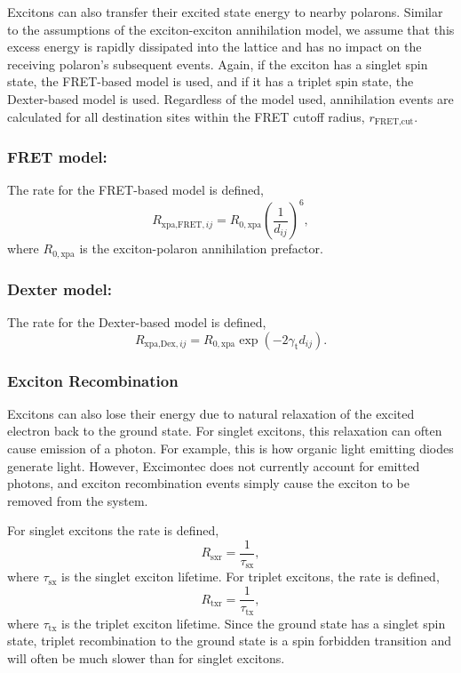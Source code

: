\documentclass[%
 reprint,onecolumn,notitlepage,
superscriptaddress,longbibliography,
 amsmath,amssymb,
 aps,rmp,floatfix,
]{revtex4-1}
\begin{document}
Excitons can also transfer their excited state energy to nearby polarons.
Similar to the assumptions of the exciton-exciton annihilation model, we assume that this excess energy is rapidly dissipated into the lattice and has no impact on the receiving polaron's subsequent events.
Again, if the exciton has a singlet spin state, the FRET-based model is used, and if it has a triplet spin state, the Dexter-based model is used. Regardless of the model used, annihilation events are calculated for all destination sites within the FRET cutoff radius, $r_{\text{FRET,cut}}$.

\subsubsection*{\textbf{FRET model:}}

The rate for the FRET-based model is defined,
$$R_{\text{xpa,FRET},ij} = R_{0,\text{xpa}} \left( \frac{1}{d_{ij}} \right)^6,$$
where $R_{0,\text{xpa}}$ is the exciton-polaron annihilation prefactor.

\subsubsection*{\textbf{Dexter model:}}

The rate for the Dexter-based model is defined,
$$R_{\text{xpa,Dex},ij} = R_{0,\text{xpa}} \exp{\left(- 2 \gamma_{\text{t}} d_{ij} \right)}.$$

\subsubsection{Exciton Recombination}

Excitons can also lose their energy due to natural relaxation of the excited electron back to the ground state.
For singlet excitons, this relaxation can often cause emission of a photon.
For example, this is how organic light emitting diodes generate light.
However, Excimontec does not currently account for emitted photons, and exciton recombination events simply cause the exciton to be removed from the system.

For singlet excitons the rate is defined,
$$R_\text{sxr} = \frac{1}{\tau_\text{sx}},$$
where $\tau_\text{sx}$ is the singlet exciton lifetime.
For triplet excitons, the rate is defined,
$$R_\text{txr} = \frac{1}{\tau_\text{tx}},$$
where $\tau_\text{tx}$ is the triplet exciton lifetime.
Since the ground state has a singlet spin state, triplet recombination to the ground state is a spin forbidden transition and will often be much slower than for singlet excitons.
\end{document}
